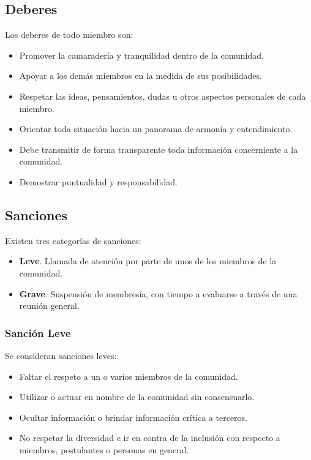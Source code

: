 \documentclass[12pt, letterpaper]{article}
\begin{document}
    \subsection{Deberes}
    Los deberes de todo miembro son:
    \begin{itemize}
        \item Promover la camaradería y tranquilidad dentro de la comunidad.
        \item Apoyar a los demás miembros en la medida de sus posibilidades.
        \item Respetar las ideas, pensamientos, dudas u otros aspectos 
        personales de cada miembro.
        \item Orientar toda situación hacia un panorama de armonía y 
        entendimiento.
        \item Debe transmitir de forma transparente toda información 
        concerniente a la comunidad.
        \item Demostrar puntualidad y responsabilidad.
    \end{itemize}
    
    \subsection{Sanciones}
    Existen tres categorías de sanciones:
    \begin{itemize}
        \item \textbf{Leve}. Llamada de atención por parte de unos de los
        miembros de la comunidad.
        \item \textbf{Grave}. Suspensión de membresía, con tiempo a evaluarse a 
        través de una reunión general.
    \end{itemize}

    \subsubsection{Sanción Leve}
    Se consideran sanciones leves:
    \begin{itemize}
        \item Faltar el respeto a un o varios miembros de la comunidad.
        \item Utilizar o actuar en nombre de la comunidad sin consensuarlo.
        \item Ocultar información o brindar información crítica a terceros.
        \item No respetar la diversidad e ir en contra de la inclusión con 
        respecto a miembros, postulantes o personas en general.
    \end{itemize}
\end{document}

